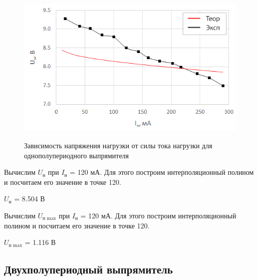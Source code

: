 \begin{figure}[H]
	\begin{center}
		\includegraphics[height=7.5cm]{img/3}
		\caption{Зависимость напряжения нагрузки от силы тока нагрузки для однополупериодного выпрямителя}
		\label{g:3} %
	\end{center}
\end{figure}



Вычислим $U_\text{н}$ при $I_\text{н}$ = 120 мА. Для этого построим интерполяционный полином и посчитаем его значение в точке 120.

$U_\text{н}$ = 8.504 В

Вычислим $U_\text{п max}$ при $I_\text{н}$ = 120 мА. Для этого построим интерполяционный полином и посчитаем его значение в точке 120.

$U_\text{п max}$ = 1.116 В

\subsection{Двухполупериодный выпрямитель}

